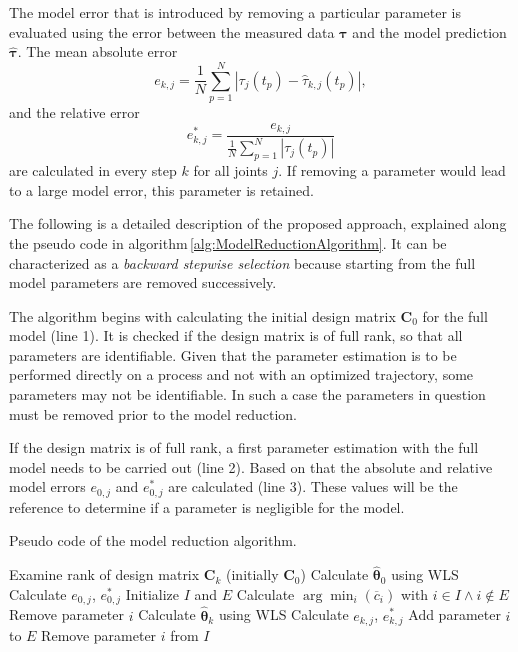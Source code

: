The model error that is introduced by removing a particular parameter is evaluated using the error between the measured data $\boldsymbol{\tau}$ and the model prediction $\hat{\boldsymbol{\tau}}$. The mean absolute error 
\begin{equation}\label{eq:absError}
	e_{k,j} = \frac{1}{N}  \sum\limits_{p=1}^{N} \left| \tau_j(t_p) - \hat{\tau}_{k,j}(t_p) \right|,
\end{equation}
and the relative error
\begin{equation}\label{eq:relError}
	e^*_{k,j} = \frac{e_{k,j}}{\frac{1}{N} \sum\limits_{p=1}^{N} \left| \tau_j(t_p) \right|}
\end{equation}
are calculated in every step $k$ for all joints $j$. If removing a parameter would lead to a large model error, this parameter is retained.

The following is a detailed description of the proposed approach, explained along the pseudo code in algorithm\,\ref{alg:ModelReductionAlgorithm}. It can be characterized as a \textit{backward stepwise selection} \cite{Volinsky1997} because starting from the full model parameters are removed successively.

The algorithm begins with calculating the initial design matrix $\boldsymbol{C}_0$ for the full model (line 1). It is checked if the design matrix is of full rank, so that all parameters are identifiable. Given that the parameter estimation is to be performed directly on a process and not with an optimized trajectory, some parameters may not be identifiable. In such a case the parameters in question must be removed prior to the model reduction.

If the design matrix is of full rank, a first parameter estimation with the full model needs to be carried out (line 2). Based on that the absolute and relative model errors $e_{0,j}$ and $e^*_{0,j}$ are calculated (line 3). These values will be the reference to determine if a parameter is negligible for the model.

\begin{algorithm}[ht]
\caption{Pseudo code of the model reduction algorithm.}\label{alg:ModelReductionAlgorithm}
	\begin{algorithmic}[1]
	\State Examine rank of design matrix $\boldsymbol{C}_k$ (initially $\boldsymbol{C}_0$)
	\State Calculate $\hat{\boldsymbol{\theta}}_{0}$ using WLS
	\State Calculate $e_{0,j}$, $e^*_{0,j}$
	\State Initialize $I$ and $E$
		\State Calculate $\arg \min_{i} (\overline{c}_i)$ with $i \in I \wedge i \notin E$
		\State Remove parameter $i$
		\State Calculate $\hat{\boldsymbol{\theta}}_{k}$ using WLS
		\State Calculate $e_{k,j}$, $e^*_{k,j}$
			\State Add parameter $i$ to $E$
		\Else
			\State Remove parameter $i$ from $I$
		\EndIf
	\EndFor
	\end{algorithmic}
\end{algorithm}

